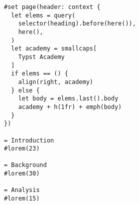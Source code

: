 \begin{verbatim}
#set page(header: context {
  let elems = query(
    selector(heading).before(here()),
    here(),
  )
  let academy = smallcaps[
    Typst Academy
  ]
  if elems == () {
    align(right, academy)
  } else {
    let body = elems.last().body
    academy + h(1fr) + emph(body)
  }
})

= Introduction
#lorem(23)

= Background
#lorem(30)

= Analysis
#lorem(15)
\end{verbatim}

\pandocbounded{}
